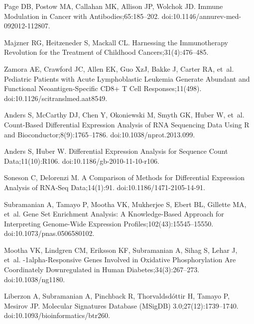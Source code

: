 \documentclass[10pt,letterpaper]{article}
\begin{document}
\begin{thebibliography}{10}
	Page DB, Postow MA, Callahan MK, Allison JP, Wolchok JD.
	\newblock Immune Modulation in Cancer with Antibodies;65:185--202.
	\newblock doi:{10.1146/annurev-med-092012-112807}.
	
	Majzner RG, Heitzeneder S, Mackall CL.
	\newblock Harnessing the Immunotherapy Revolution for the Treatment of
	Childhood Cancers;31(4):476--485.
	
	Zamora AE, Crawford JC, Allen EK, Guo XzJ, Bakke J, Carter RA, et~al.
	\newblock Pediatric Patients with Acute Lymphoblastic Leukemia Generate
	Abundant and Functional Neoantigen-Specific {{CD8}}+ {{T}} Cell
	Responses;11(498).
	\newblock doi:{10.1126/scitranslmed.aat8549}.
	
	Anders S, McCarthy DJ, Chen Y, Okoniewski M, Smyth GK, Huber W, et~al.
	\newblock Count-Based Differential Expression Analysis of {{RNA}} Sequencing
	Data Using {{R}} and {{Bioconductor}};8(9):1765--1786.
	\newblock doi:{10.1038/nprot.2013.099}.
	
	Anders S, Huber W.
	\newblock Differential Expression Analysis for Sequence Count Data;11(10):R106.
	\newblock doi:{10.1186/gb-2010-11-10-r106}.
	
	Soneson C, Delorenzi M.
	\newblock A Comparison of Methods for Differential Expression Analysis of
	{{RNA}}-Seq Data;14(1):91.
	\newblock doi:{10.1186/1471-2105-14-91}.
	
	Subramanian A, Tamayo P, Mootha VK, Mukherjee S, Ebert BL, Gillette MA, et~al.
	\newblock Gene Set Enrichment Analysis: A Knowledge-Based Approach for
	Interpreting Genome-Wide Expression Profiles;102(43):15545--15550.
	\newblock doi:{10.1073/pnas.0506580102}.
	
	Mootha VK, Lindgren CM, Eriksson KF, Subramanian A, Sihag S, Lehar J, et~al.
	-1alpha-Responsive Genes Involved in Oxidative Phosphorylation
	Are Coordinately Downregulated in Human Diabetes;34(3):267--273.
	\newblock doi:{10.1038/ng1180}.
	
	Liberzon A, Subramanian A, Pinchback R, Thorvaldsdóttir H, Tamayo P, Mesirov
	JP.
	\newblock Molecular Signatures Database ({{MSigDB}}) 3.0;27(12):1739--1740.
	\newblock doi:{10.1093/bioinformatics/btr260}.
	

\end{thebibliography}
\end{document}
